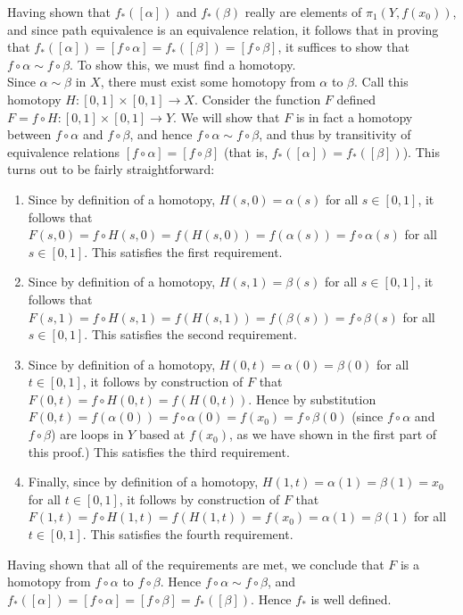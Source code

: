 \documentclass{article}
\begin{document}
Having shown that $f_*([\alpha])$ and $f_*(\beta)$ really are elements of $\pi_1(Y, f(x_0))$, and since path equivalence is an equivalence relation, it follows that in proving that $f_*([\alpha]) = [f\circ \alpha] = f_*([\beta]) = [f\circ \beta]$, it suffices to show that $f\circ \alpha \sim f\circ \beta$. To show this, we must find a homotopy. \\

Since $\alpha\sim \beta$ in $X$, there must exist some homotopy from $\alpha$ to $\beta$. Call this homotopy $H: [0,1]\times[0,1]\rightarrow X$. Consider the function $F$ defined $F 
= f\circ H : [0,1]\times [0,1]\rightarrow Y$. We will show that $F$ is in fact a homotopy between $f\circ \alpha$ and $f\circ \beta$, and hence $f\circ\alpha\sim f\circ \beta$, and thus by transitivity of equivalence relations $[f\circ \alpha] = [f\circ \beta]$ (that is, $f_*([\alpha]) = f_*([\beta])$). This turns out to be fairly straightforward:
\begin{enumerate}
    \item Since by definition of a homotopy, $H(s, 0) = \alpha(s)$ for all $s\in [0,1]$, it follows that $F(s,0) = f\circ H(s,0) = f(H(s,0)) = f(\alpha(s)) = f\circ \alpha(s)$ for all $s\in [0,1]$. This satisfies the first requirement.
    \item Since by definition of a homotopy, $H(s,1) = \beta(s)$ for all $s\in [0,1]$, it follows that $F(s, 1) = f\circ H(s,1) = f(H(s,1)) = f(\beta(s)) = f\circ \beta(s)$ for all $s\in [0,1]$. This satisfies the second requirement.
    \item Since by definition of a homotopy, $H(0,t) = \alpha(0) = \beta(0)$ for all $t\in [0,1]$, it follows by construction of $F$ that $F(0,t) = f\circ H(0,t) = f(H(0,t))$. Hence by substitution $F(0,t) = f(\alpha(0)) = f\circ \alpha(0) = f(x_0) = f\circ \beta(0)$ (since $f\circ \alpha$ and $f\circ \beta$) are loops in $Y$ based at $f(x_0)$, as we have shown in the first part of this proof.) This satisfies the third requirement.
    \item Finally, since by definition of a homotopy, $H(1,t) = \alpha(1) = \beta(1) = x_0$ for all $t\in [0,1]$, it follows by construction of $F$ that $F(1,t) = f\circ H(1,t) = f(H(1,t)) = f(x_0) = \alpha(1) = \beta(1)$ for all $t\in [0,1]$.  This satisfies the fourth requirement.
\end{enumerate}
Having shown that all of the requirements are met, we conclude that $F$ is a homotopy from $f\circ\alpha$ to $f\circ \beta$. Hence $f\circ \alpha\sim f\circ \beta$, and $f_*([\alpha]) = [f\circ \alpha] = [f\circ \beta] = f_*([\beta])$. Hence $f_*$ is well defined.\\
\end{document}

